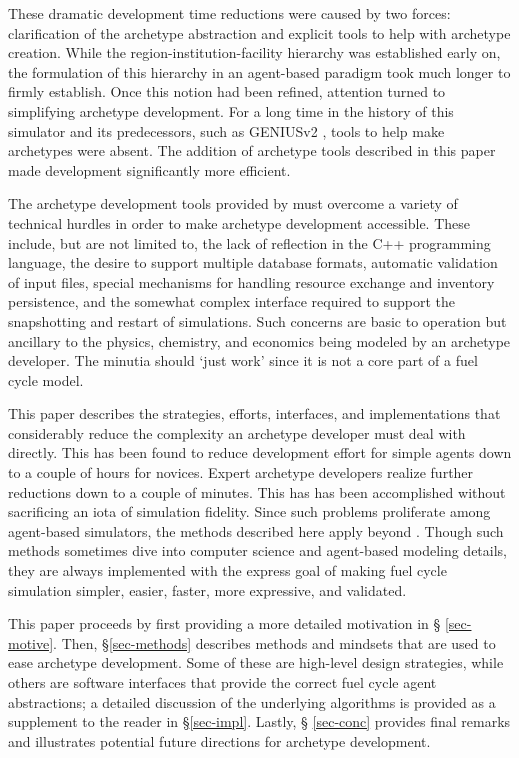 These dramatic development time reductions were caused by two forces:
clarification of the archetype abstraction and explicit tools to help with 
archetype creation. While the region-institution-facility hierarchy was established 
early on, the formulation of this hierarchy in an agent-based paradigm took much 
longer to firmly establish.  Once this notion had been refined, attention turned to 
simplifying \Cyclus archetype development.
For a long time in the history of this simulator and its predecessors, such as 
\gls{GENIUSv2} \cite{oliver_studying_2009}, tools to help make archetypes were 
absent.
The addition of archetype tools described in this paper made development significantly more efficient.

The archetype development tools provided by \cyclus must overcome a variety of 
technical hurdles in order to make archetype development accessible.  These 
include, but are not limited to, the lack of reflection in the C++ programming language,
the desire to support multiple database formats, automatic validation of input files,
special mechanisms for handling resource exchange and inventory persistence, 
and the somewhat complex interface required to support the snapshotting and 
restart of simulations. Such concerns are basic to \cyclus operation but 
ancillary to the physics, chemistry, and economics being modeled by an 
archetype developer.
The minutia should `just work' since it is not a core part of a fuel cycle model.

This paper describes the strategies, efforts, interfaces,
and implementations that considerably reduce the complexity  
an archetype developer must deal with directly. This has been 
found to reduce development effort for simple agents down to a couple 
of hours for novices. Expert archetype developers realize further 
reductions down to a couple of minutes. This has has been accomplished 
without sacrificing an iota of simulation fidelity. Since such 
problems proliferate among agent-based simulators, the methods described here apply beyond \cyclus.
Though such methods sometimes dive into 
computer science and agent-based modeling details, they are always implemented
with the express goal of making fuel cycle simulation 
simpler, easier, faster, more expressive, and validated.

This paper proceeds by first providing a more detailed motivation in \S
\ref{sec-motive}. Then, \S \ref{sec-methods} describes methods and mindsets that
are used to ease archetype development.  Some of these are high-level design
strategies, while others are software interfaces that provide the correct fuel
cycle agent abstractions; a detailed discussion of the underlying algorithms is
provided as a supplement to the reader in \S \ref{sec-impl}.  Lastly, \S
\ref{sec-conc} provides final remarks and illustrates potential future
directions for \cyclus archetype development.
